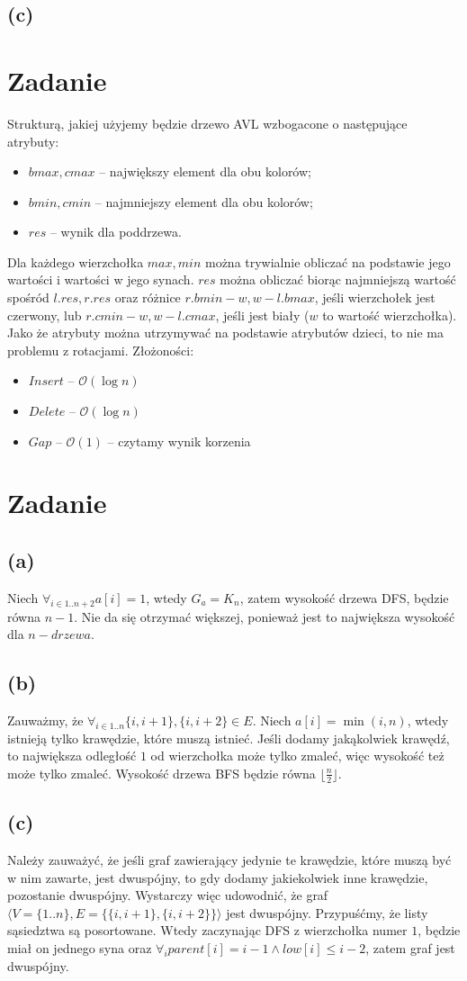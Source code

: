 \documentclass[12pt, a4paper]{article}
\newcommand{\MCALO}{\mathcal{O}}
\newcounter{zadanie}
\newcommand{\zadanie}{\addtocounter{zadanie}{1}\section*{Zadanie \arabic{zadanie}}}
\begin{document}
\subsection*{(c)}

\zadanie{}
Strukturą, jakiej użyjemy będzie drzewo AVL wzbogacone o następujące atrybuty:
\begin{itemize}
  \item $bmax,cmax$ -- największy element dla obu kolorów;
  \item $bmin,cmin$ -- najmniejszy element dla obu kolorów;
  \item $res$ -- wynik dla poddrzewa.
\end{itemize}
Dla każdego wierzchołka $max, min$ można trywialnie obliczać na podstawie jego
wartości i wartości w jego synach. $res$ można obliczać biorąc najmniejszą
wartość spośród $l.res, r.res$ oraz różnice $r.bmin - w, w - l.bmax$, jeśli
wierzchołek jest czerwony, lub $r.cmin - w, w - l.cmax$, jeśli jest biały ($w$
to wartość wierzchołka). Jako że atrybuty można utrzymywać na podstawie
atrybutów dzieci, to nie ma problemu z rotacjami.
Złożoności:
\begin{itemize}
  \item $\mathit{Insert}$ -- $\MCALO(\log{n})$
  \item $\mathit{Delete}$ -- $\MCALO(\log{n})$
  \item $\mathit{Gap}$ -- $\MCALO(1)$ -- czytamy wynik korzenia
\end{itemize}

\zadanie{}
\subsection*{(a)}
Niech $\forall_{i\in{1..n+2}} a[i] = 1$, wtedy $G_a = K_n$, zatem wysokość drzewa
DFS, będzie równa $n-1$. Nie da się otrzymać większej, ponieważ jest to
największa wysokość dla $n-drzewa$.

\subsection*{(b)}
Zauważmy, że $\forall_{i\in{1..n}} \{i,i+1\}, \{i,i+2\} \in E$. Niech $a[i]
= \min(i, n)$, wtedy istnieją tylko krawędzie, które muszą istnieć. Jeśli dodamy
jakąkolwiek krawędź, to największa odległość $1$ od wierzchołka może tylko
zmaleć, więc wysokość też może tylko zmaleć. Wysokość drzewa BFS będzie równa
$\lfloor\frac{n}{2}\rfloor$.

\subsection*{(c)}
Należy zauważyć, że jeśli graf zawierający jedynie te krawędzie, które muszą
być w nim zawarte, jest dwuspójny, to gdy dodamy jakiekolwiek inne krawędzie,
pozostanie dwuspójny. Wystarczy więc udowodnić, że graf
$\langle V=\{1..n\},E = \{ \{i,i+1\} , \{i,i+2\} \}\rangle$
jest dwuspójny. Przypuśćmy, że listy sąsiedztwa są posortowane. Wtedy
zaczynając DFS z wierzchołka numer $1$, będzie miał on jednego syna oraz
$\forall_i parent[i] = i-1 \land low[i] \le i-2$, zatem graf jest dwuspójny.
\end{document}
